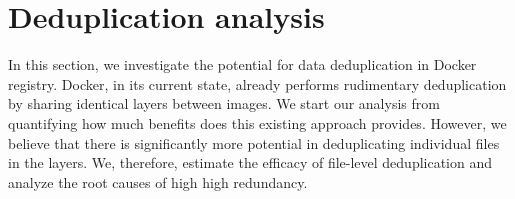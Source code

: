 \section{Deduplication analysis}
\label{sec:redundant_files}

In this section, we investigate the potential for data deduplication in Docker
registry.
%
Docker, in its current state, already performs rudimentary deduplication by
sharing identical layers between images. 
%
We start our analysis from quantifying how much benefits does this existing
approach provides.
%
However, we believe that there is significantly more potential in deduplicating
individual files in the layers.
%
We, therefore, estimate the efficacy of file-level deduplication and analyze
the root causes of high high redundancy.



